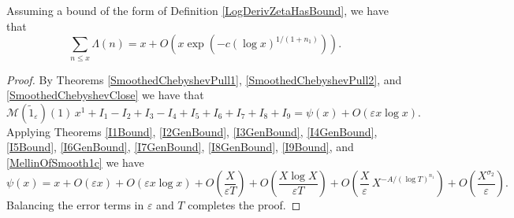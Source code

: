 \begin{theorem}[GenStrengthPNT]
\label{GenStrengthPNT}
\leanok
Assuming a bound of the form of Definition \ref{LogDerivZetaHasBound}, we have that
    $$\sum_{n \leq x}\Lambda(n)=x+O(x\exp(-c(\log x)^{1/(1+n_1)})).$$
\end{theorem}
\begin{proof}
\leanok
By Theorems \ref{SmoothedChebyshevPull1}, \ref{SmoothedChebyshevPull2},
    and \ref{SmoothedChebyshevClose} we have that
    $$\mathcal{M}(\tilde{1}_\varepsilon)(1)\,x^1+I_1-I_2+I_3-I_4+I_5+I_6+I_7+I_8+I_9
      =\psi(x)+O(\varepsilon x\log x).$$
    Applying Theorems \ref{I1Bound}, \ref{I2GenBound}, \ref{I3GenBound}, \ref{I4GenBound},
    \ref{I5Bound}, \ref{I6GenBound}, \ref{I7GenBound}, \ref{I8GenBound}, \ref{I9Bound},
    and \ref{MellinOfSmooth1c} we have
    $$\psi(x)=x+O(\varepsilon x)+O(\varepsilon x\log x)+O\left(\frac{X}{\varepsilon T}\right)+
      O\left(\frac{X\log X}{\varepsilon T}\right)+
      O\left(\frac{X}{\varepsilon}\,X^{-A/(\log T)^{n_1}}\right)+
      O\left(\frac{X^{\sigma_2}}{\varepsilon}\right).$$
    Balancing the error terms in $\varepsilon$ and $T$ completes the proof.
\end{proof}
